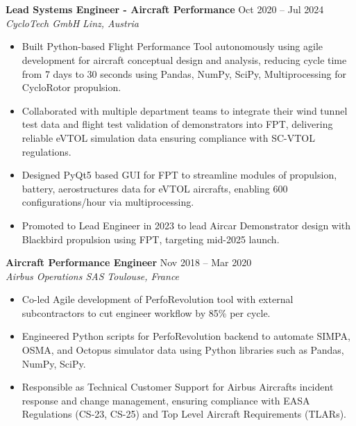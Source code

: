 \documentclass[9pt]{article}        %
\begin{document}
\section*{{\fontsize{12}{14.4}\selectfont{}}{\fontsize{9}{10.8}\selectfont{}}}
\textbf{Lead Systems Engineer - Aircraft Performance} \hfill {Oct 2020 – Jul 2024} \\
\textit{CycloTech GmbH} \hfill \textit{Linz, Austria}
\begin{itemize}
  \item Built Python-based Flight Performance Tool autonomously using agile development for aircraft conceptual design and analysis, reducing cycle time from 7 days to 30 seconds using Pandas, NumPy, SciPy, Multiprocessing for CycloRotor propulsion.
  \item Collaborated with multiple department teams to integrate their wind tunnel test data and flight test validation of demonstrators into FPT, delivering reliable eVTOL simulation data ensuring compliance with SC-VTOL regulations.
  \item Designed PyQt5 based GUI for FPT to streamline modules of propulsion, battery, aerostructures data for eVTOL aircrafts, enabling 600 configurations/hour via multiprocessing.
  \item Promoted to Lead Engineer in 2023 to lead Aircar Demonstrator design with Blackbird propulsion using FPT, targeting mid-2025 launch.
\end{itemize}
\vspace{+5pt} %

\textbf{Aircraft Performance Engineer} \hfill {Nov 2018 – Mar 2020}\\
\textit{Airbus Operations SAS} \hfill \textit{Toulouse, France}
\begin{itemize}
  \item Co-led Agile development of PerfoRevolution tool with external subcontractors to cut engineer workflow by 85\% per cycle.
  \item Engineered Python scripts for PerfoRevolution backend to automate SIMPA, OSMA, and Octopus simulator data using Python libraries such as Pandas, NumPy, SciPy.
  \item Responsible as Technical Customer Support for Airbus Aircrafts incident response and change management, ensuring compliance with EASA Regulations (CS-23, CS-25) and Top Level Aircraft Requirements (TLARs).
\end{itemize}
\vspace{+5pt} %
\end{document}
